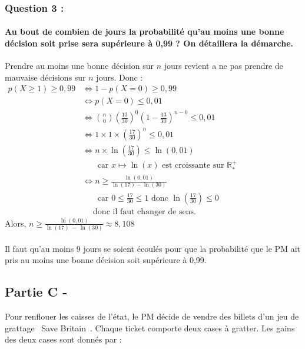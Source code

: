\documentclass[a4paper, 12pt]{article}
\begin{document}
\subsubsection*{Question 3 :}
\paragraph*{Au bout de combien de jours la probabilité qu'au moins une bonne décision soit prise sera supérieure à 0,99 ? On détaillera la démarche.\\[5mm]}

Prendre au moins une bonne décision sur $n$ jours revient a ne pas prendre de mauvaise décisions sur $n$ jours. Donc : \\
$\begin{aligned}
p(X \geq 1) \geq 0,99 &\iff 1 - p(X = 0) \geq 0,99 \\
&\iff p(X = 0) \leq 0,01 \\
&\iff \binom{n}{0} \left( \frac{13}{30}\right)^0 \left(1 - \frac{13}{30}\right)^{n-0} \leq 0,01 \\
&\iff 1 \times 1 \times \left(\frac{17}{30} \right)^n \leq 0,01 \\
&\iff n \times \ln{\left( \frac{17}{30} \right) } \leq \ln{\left(0,01\right)} \\ 
&\phantom{\iff} \text{ car } x \mapsto \ln{\left(x\right)} \text{ est croissante sur } \mathbb{R}^+_*\\
&\iff n  \geq \frac{\ln{\left(0,01\right)}}{\ln{\left(17\right)}-\ln{\left(30\right)}} \\
&\phantom{\iff} \text{ car } 0 \leq \frac{17}{30} \leq 1 \text{ donc } \ln{\left(\frac{17}{30}\right)} \leq 0 \\
& \phantom{\iff} \text{ donc il faut changer de sens.}
\end{aligned}$
\\[2mm]
Alors, $n \geq \frac{\ln{\left(0,01\right)}}{\ln{\left(17\right)}\ -\ \ln{\left(30\right)}} \approx 8,108 $
\\ \\
Il faut qu'au moins 9 jours se soient écoulés pour que la probabilité que le PM ait pris au moins une bonne décision soit supérieure à 0,99.

{}
\subsection*{Partie C -}
Pour renflouer les caisses de l'état, le PM décide de vendre des billets d'un jeu de grattage \guillemotleft\ Save Britain\ \guillemotright. Chaque ticket comporte deux cases à gratter. 
Les gains des deux cases sont donnés par : 
\\
\end{document}
